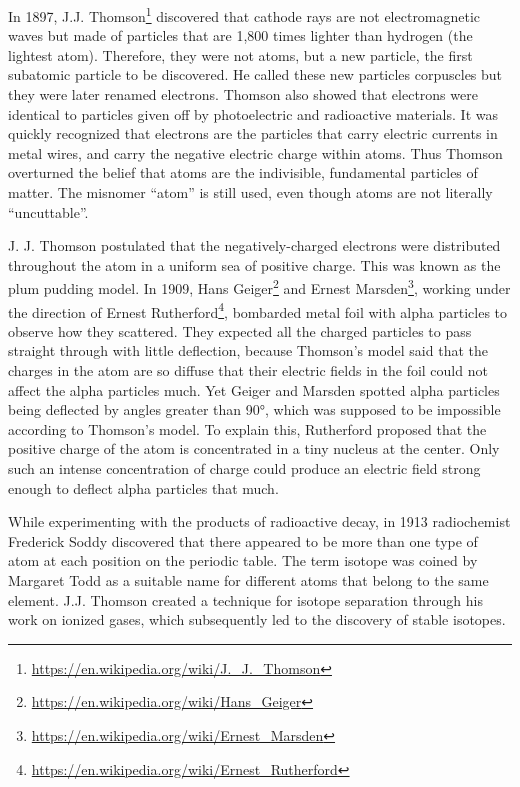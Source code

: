 \documentclass[
]{book}
\renewcommand{\href}[2]{#2\footnote{\url{#1}}}
\begin{document}
In 1897, \href{https://en.wikipedia.org/wiki/J._J._Thomson}{J.J. Thomson} discovered that cathode rays are not electromagnetic waves but made of particles that are 1,800 times lighter than hydrogen (the lightest atom). Therefore, they were not atoms, but a new particle, the first subatomic particle to be discovered. He called these new particles corpuscles but they were later renamed electrons. Thomson also showed that electrons were identical to particles given off by photoelectric and radioactive materials. It was quickly recognized that electrons are the particles that carry electric currents in metal wires, and carry the negative electric charge within atoms. Thus Thomson overturned the belief that atoms are the indivisible, fundamental particles of matter. The misnomer ``atom'' is still used, even though atoms are not literally ``uncuttable''.

J. J. Thomson postulated that the negatively-charged electrons were distributed throughout the atom in a uniform sea of positive charge. This was known as the plum pudding model. In 1909, \href{https://en.wikipedia.org/wiki/Hans_Geiger}{Hans Geiger} and \href{https://en.wikipedia.org/wiki/Ernest_Marsden}{Ernest Marsden}, working under the direction of \href{https://en.wikipedia.org/wiki/Ernest_Rutherford}{Ernest Rutherford}, bombarded metal foil with alpha particles to observe how they scattered. They expected all the charged particles to pass straight through with little deflection, because Thomson's model said that the charges in the atom are so diffuse that their electric fields in the foil could not affect the alpha particles much. Yet Geiger and Marsden spotted alpha particles being deflected by angles greater than 90°, which was supposed to be impossible according to Thomson's model. To explain this, Rutherford proposed that the positive charge of the atom is concentrated in a tiny nucleus at the center. Only such an intense concentration of charge could produce an electric field strong enough to deflect alpha particles that much.

While experimenting with the products of radioactive decay, in 1913 radiochemist Frederick Soddy discovered that there appeared to be more than one type of atom at each position on the periodic table. The term isotope was coined by Margaret Todd as a suitable name for different atoms that belong to the same element. J.J. Thomson created a technique for isotope separation through his work on ionized gases, which subsequently led to the discovery of stable isotopes.
\end{document}
